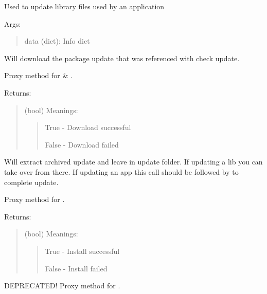 \documentclass[letterpaper,10pt,english]{sphinxmanual}
\begin{document}
\begin{fulllineitems}
\label{api:pyi_updater.client.updates.LibUpdate}
Used to update library files used by an application

Args:
\begin{quote}

data (dict): Info dict
\end{quote}

\begin{fulllineitems}
\label{api:pyi_updater.client.updates.LibUpdate.download}
Will download the package update that was referenced
with check update.

Proxy method for  \& .

Returns:
\begin{quote}

(bool) Meanings:
\begin{quote}

True - Download successful

False - Download failed
\end{quote}
\end{quote}

\end{fulllineitems}


\begin{fulllineitems}
\label{api:pyi_updater.client.updates.LibUpdate.extract}
Will extract archived update and leave in update folder.
If updating a lib you can take over from there. If updating
an app this call should be followed by  to
complete update.

Proxy method for .

Returns:
\begin{quote}

(bool) Meanings:
\begin{quote}

True - Install successful

False - Install failed
\end{quote}
\end{quote}

\end{fulllineitems}


\begin{fulllineitems}
\label{api:pyi_updater.client.updates.LibUpdate.install}
DEPRECATED! Proxy method for {\hyperref[api:pyi_updater.client.updates.LibUpdate.extract]{}}.

\end{fulllineitems}


\end{fulllineitems}
\end{document}
